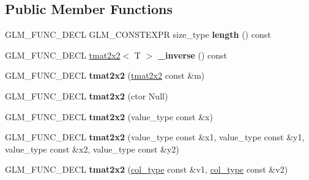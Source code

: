 \subsection*{Public Member Functions}
\begin{DoxyCompactItemize}
\item 
\hypertarget{structglm_1_1detail_1_1tmat2x2_a533f51f175c66b820f2794b018c6ab46}{}G\+L\+M\+\_\+\+F\+U\+N\+C\+\_\+\+D\+E\+C\+L G\+L\+M\+\_\+\+C\+O\+N\+S\+T\+E\+X\+P\+R size\+\_\+type {\bfseries length} () const \label{structglm_1_1detail_1_1tmat2x2_a533f51f175c66b820f2794b018c6ab46}

\item 
\hypertarget{structglm_1_1detail_1_1tmat2x2_a40d83f7f92111204f47b99d3416edc7f}{}G\+L\+M\+\_\+\+F\+U\+N\+C\+\_\+\+D\+E\+C\+L \hyperlink{structglm_1_1detail_1_1tmat2x2}{tmat2x2}$<$ T $>$ {\bfseries \+\_\+inverse} () const \label{structglm_1_1detail_1_1tmat2x2_a40d83f7f92111204f47b99d3416edc7f}

\item 
\hypertarget{structglm_1_1detail_1_1tmat2x2_a3af20d808ee9aa41d24998c5cc067bc0}{}G\+L\+M\+\_\+\+F\+U\+N\+C\+\_\+\+D\+E\+C\+L {\bfseries tmat2x2} (\hyperlink{structglm_1_1detail_1_1tmat2x2}{tmat2x2} const \&m)\label{structglm_1_1detail_1_1tmat2x2_a3af20d808ee9aa41d24998c5cc067bc0}

\item 
\hypertarget{structglm_1_1detail_1_1tmat2x2_a8f4070e1c3bfd05568b2dd2fddcaffae}{}G\+L\+M\+\_\+\+F\+U\+N\+C\+\_\+\+D\+E\+C\+L {\bfseries tmat2x2} (ctor Null)\label{structglm_1_1detail_1_1tmat2x2_a8f4070e1c3bfd05568b2dd2fddcaffae}

\item 
\hypertarget{structglm_1_1detail_1_1tmat2x2_a57f8c79a1f8df9214a4357b2b1952ff2}{}G\+L\+M\+\_\+\+F\+U\+N\+C\+\_\+\+D\+E\+C\+L {\bfseries tmat2x2} (value\+\_\+type const \&x)\label{structglm_1_1detail_1_1tmat2x2_a57f8c79a1f8df9214a4357b2b1952ff2}

\item 
\hypertarget{structglm_1_1detail_1_1tmat2x2_a846f370292295c373888c00dc63db0c3}{}G\+L\+M\+\_\+\+F\+U\+N\+C\+\_\+\+D\+E\+C\+L {\bfseries tmat2x2} (value\+\_\+type const \&x1, value\+\_\+type const \&y1, value\+\_\+type const \&x2, value\+\_\+type const \&y2)\label{structglm_1_1detail_1_1tmat2x2_a846f370292295c373888c00dc63db0c3}

\item 
\hypertarget{structglm_1_1detail_1_1tmat2x2_a3b1111723d77e85f6f836e6fec22d0d3}{}G\+L\+M\+\_\+\+F\+U\+N\+C\+\_\+\+D\+E\+C\+L {\bfseries tmat2x2} (\hyperlink{structglm_1_1detail_1_1tvec2}{col\+\_\+type} const \&v1, \hyperlink{structglm_1_1detail_1_1tvec2}{col\+\_\+type} const \&v2)\label{structglm_1_1detail_1_1tmat2x2_a3b1111723d77e85f6f836e6fec22d0d3}


\end{DoxyCompactItemize}
